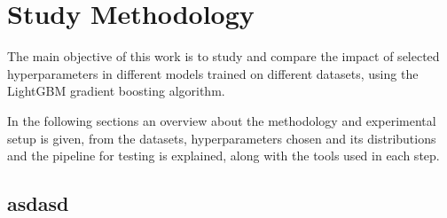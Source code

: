 \chapter{Study Methodology}
\label{cap:study-methodology}

The main objective of this work is to study and compare the impact of selected hyperparameters in different models trained on different datasets, using the LightGBM gradient boosting algorithm. 

In the following sections an overview about the methodology and experimental setup is given, from the datasets, hyperparameters chosen and its distributions and the pipeline for testing is explained, along with the tools used in each step.

\section{asdasd}
